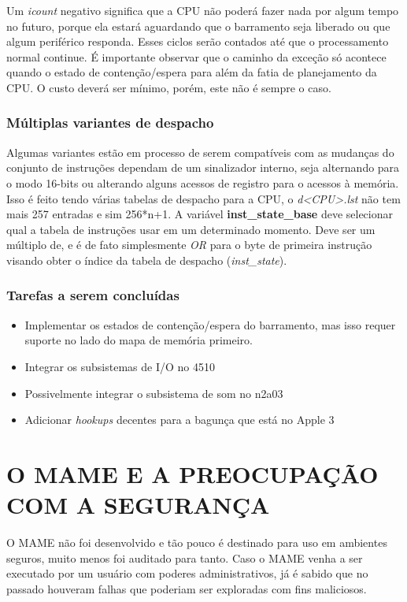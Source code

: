 \documentclass[letterpaper,10pt,brazil]{sphinxmanual}
\begin{document}
Um \emph{icount} negativo significa que a CPU não poderá fazer nada por algum
tempo no futuro, porque ela estará aguardando que o barramento seja
liberado ou que algum periférico responda. Esses ciclos serão contados
até que o processamento normal continue. É importante observar que o
caminho da exceção só acontece quando o estado de contenção/espera para
além da fatia de planejamento da CPU. O custo deverá ser mínimo, porém,
este não é sempre o caso.


\subsection{Múltiplas variantes de despacho}
\label{techspecs/m6502:multiplas-variantes-de-despacho}
Algumas variantes estão em processo de serem compatíveis com as mudanças
do conjunto de instruções dependam de um sinalizador interno,
seja alternando para o modo 16-bits ou alterando alguns acessos de
registro para o acessos à memória. Isso é feito tendo várias tabelas de
despacho para a CPU, o \emph{d\textless{}CPU\textgreater{}.lst} não tem mais 257 entradas e sim
256*n+1. A variável \textbf{inst\_state\_base} deve selecionar qual a tabela de
instruções usar em um determinado momento. Deve ser um múltiplo de, e é
de fato simplesmente \emph{OR} para o byte de primeira instrução visando
obter o índice da tabela de despacho (\emph{inst\_state}).


\subsection{Tarefas a serem concluídas}
\label{techspecs/m6502:tarefas-a-serem-concluidas}\begin{itemize}
\item {} 
Implementar os estados de contenção/espera do barramento, mas isso
requer suporte no lado do mapa de memória primeiro.

\item {} 
Integrar os subsistemas de I/O no 4510

\item {} 
Possivelmente integrar o subsistema de som no n2a03

\item {} 
Adicionar \emph{hookups} decentes para a bagunça que está no Apple 3

\end{itemize}


\chapter{O MAME E A PREOCUPAÇÃO COM A SEGURANÇA}
\label{security:o-mame-e-a-preocupacao-com-a-seguranca}\label{security::doc}\label{security:mame-security}
O MAME não foi desenvolvido e tão pouco é destinado para uso em
ambientes seguros, muito menos foi auditado para tanto. Caso o MAME
venha a ser executado por um usuário com poderes administrativos, já é
sabido que no passado houveram falhas que poderiam ser exploradas com
fins maliciosos.
\end{document}
